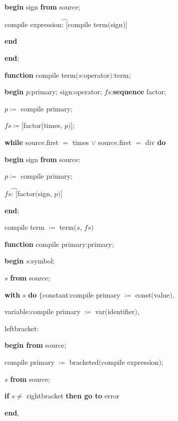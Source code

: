 \noindent
\quad \quad \quad \textbf{begin} sign \textbf{from} source;

\noindent
\quad \quad \quad \quad compile expression$\wideparen{\text{:\ }[}$compile term$($sign$)]$

\noindent
\quad \quad \quad \textbf{end}

\noindent
\quad \textbf{end};

\noindent
\textbf{function} compile term$(s$:operator$)$:term;

\noindent
\quad \textbf{begin} $p$:primary; sign:operator; $fs$:\textbf{sequence} factor;

\noindent
\quad \quad $p\coloneq$ compile primary;

\noindent
\quad \quad $fs \coloneq [$factor(times, $p)]$;

\noindent
\quad \quad \textbf{while} source.first $=$ times $\vee$ source.first $=$ div \textbf{do}

\noindent
\quad \quad \quad \textbf{begin} sign \textbf{from} source:

\noindent
\quad \quad \quad \quad $p\coloneq$ compile primary;

\noindent
\quad \quad \quad \quad $fs\wideparen{\text{: }[}$factor$($sign, $p)]$

\noindent
\quad \quad \quad \textbf{end};

\noindent
\quad \quad compile term $\coloneq$ term$(s$, $fs)$

\noindent
\textbf{function} compile primary:primary;

\noindent
\quad \textbf{begin} $s$:symbol;

\noindent
\quad \quad $s$ \textbf{from} source;

\noindent
\quad \quad \textbf{with} $s$ \textbf{do} $\{$constant:compile primary $\coloneq$ const$($value$)$,

\noindent
\quad \quad \quad variable:compile primary $\coloneq$ var$($identifier$)$,

\noindent
\quad \quad \quad leftbracket:

\noindent
\quad \quad \quad \textbf{begin from} source;

\noindent
\quad \quad \quad \quad compile primary $\coloneq$ bracketed$($compile expression$)$;

\noindent
\quad \quad \quad \quad $s$ \textbf{from} source;

\noindent
\quad \quad \quad \quad \textbf{if} $s \neq$ rightbracket \textbf{then go to} error

\noindent
\quad \quad \quad \textbf{end},

